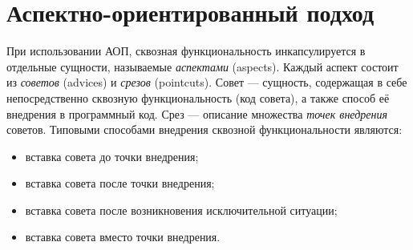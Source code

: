 \documentclass[conference]{IEEEtran}
\begin{document}

\section{Аспектно-ориентированный подход}

При использовании АОП, сквозная функциональность инкапсулируется в отдельные 
сущности, называемые \textit{аспектами} (aspects).
Каждый аспект состоит из \textit{советов} (advices) и \textit{срезов}
(pointcuts). 
Совет --- сущность, содержащая в себе непосредственно сквозную функциональность
(код совета), а также способ её внедрения в программный код.
Срез --- описание множества \textit{точек внедрения} советов. 
Типовыми способами внедрения сквозной функциональности являются:
\begin{itemize}
     \item вставка совета до точки внедрения;
     \item вставка совета после точки внедрения;
     \item вставка совета после возникновения исключительной ситуации;
     \item вставка совета вместо точки внедрения.
\end{itemize}

\end{document}
